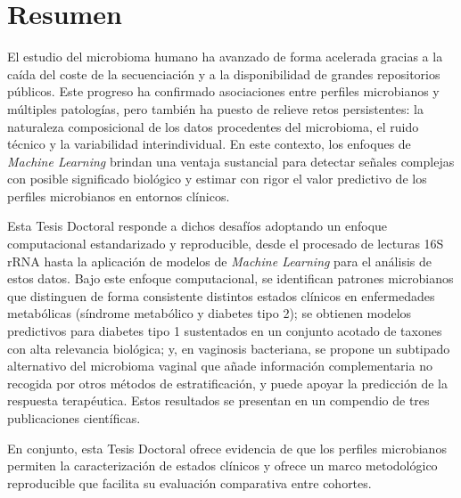 %
%




                                                                   
\chapter*{Resumen}
\label{sec:abstract_spanish}

El estudio del microbioma humano ha avanzado de forma acelerada gracias a la caída del coste de la secuenciación y a la disponibilidad de grandes repositorios públicos. Este progreso ha confirmado asociaciones entre perfiles microbianos y múltiples patologías, pero también ha puesto de relieve retos persistentes: la naturaleza composicional de los datos procedentes del microbioma, el ruido técnico y la variabilidad interindividual. En este contexto, los enfoques de \textit{Machine Learning} brindan una ventaja sustancial para detectar señales complejas con posible significado biológico y estimar con rigor el valor predictivo de los perfiles microbianos en entornos clínicos. 

Esta Tesis Doctoral responde a dichos desafíos adoptando un enfoque computacional estandarizado y reproducible, desde el procesado de lecturas 16S rRNA hasta la aplicación de modelos de \textit{Machine Learning} para el análisis de estos datos. Bajo este enfoque computacional, se identifican patrones microbianos que distinguen de forma consistente distintos estados clínicos en enfermedades metabólicas (síndrome metabólico y diabetes tipo 2); se obtienen modelos predictivos para diabetes tipo 1 sustentados en un conjunto acotado de taxones con alta relevancia biológica; y, en vaginosis bacteriana, se propone un subtipado alternativo del microbioma vaginal que añade información complementaria no recogida por otros métodos de estratificación, y puede apoyar la predicción de la respuesta terapéutica. Estos resultados se presentan en un compendio de tres publicaciones científicas. 

En conjunto, esta Tesis Doctoral ofrece evidencia de que los perfiles microbianos permiten la caracterización de estados clínicos y ofrece un marco metodológico reproducible que facilita su evaluación comparativa entre cohortes. 


